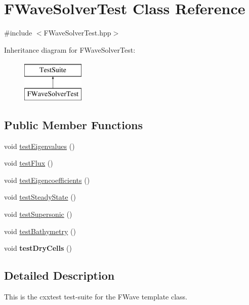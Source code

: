 \hypertarget{classFWaveSolverTest}{\section{F\-Wave\-Solver\-Test Class Reference}
\label{classFWaveSolverTest}
}


{\ttfamily \#include $<$F\-Wave\-Solver\-Test.\-hpp$>$}

Inheritance diagram for F\-Wave\-Solver\-Test\-:\begin{figure}[H]
\begin{center}
\leavevmode
\includegraphics[height=2.000000cm]{classFWaveSolverTest}
\end{center}
\end{figure}
\subsection*{Public Member Functions}
\begin{DoxyCompactItemize}
\item 
void \hyperlink{classFWaveSolverTest_a6a5438664fa3a9450ae77d5fc32747b1}{test\-Eigenvalues} ()
\item 
void \hyperlink{classFWaveSolverTest_a72acc7abe09d7d0f15ba42bab9f6e735}{test\-Flux} ()
\item 
void \hyperlink{classFWaveSolverTest_a395fa2b04c77f89c1f78961a7e50ab6b}{test\-Eigencoefficients} ()
\item 
void \hyperlink{classFWaveSolverTest_ad35f0f163ce95256f0c837243c10c590}{test\-Steady\-State} ()
\item 
void \hyperlink{classFWaveSolverTest_af466fbc855671b121201e2e480513da4}{test\-Supersonic} ()
\item 
void \hyperlink{classFWaveSolverTest_aa4d589667dac9190fece9b8ceaa9a4a9}{test\-Bathymetry} ()
\item 
\hypertarget{classFWaveSolverTest_a6924b65242f201eb48cfe5523fccb265}{void {\bfseries test\-Dry\-Cells} ()}\label{classFWaveSolverTest_a6924b65242f201eb48cfe5523fccb265}

\end{DoxyCompactItemize}


\subsection{Detailed Description}
This is the cxxtest test-\/suite for the F\-Wave template class. 


